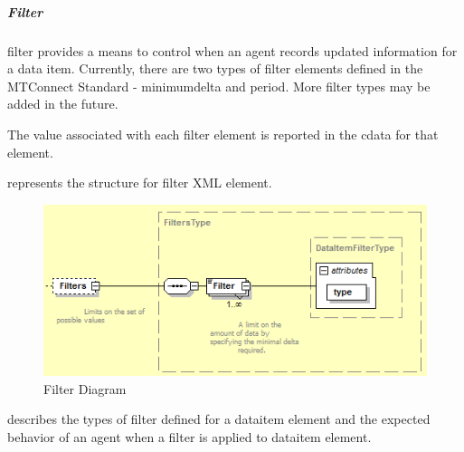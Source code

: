 \documentclass{mtconnect}	%
\begin{document}
\subparagraph{Filter} \mbox{}

\gls{filter} provides a means to control when an \gls{agent} records updated information for a data item.  Currently, there are two types of \gls{filter} elements defined in the MTConnect Standard - \gls{minimumdelta} and \gls{period}.   More \gls{filter} types may be added in the future.

The value associated with each \gls{filter} element is reported in the \gls{cdata} for that element.

 represents the structure for \gls{filter} XML element.

\begin{figure}[ht]
  \centering
  \includegraphics[width=.75\textwidth]{figures/filter-schema-diagram.png}
  \caption{Filter Diagram}
  \label{fig:filter-schema-diagram}
\end{figure}
\FloatBarrier

 describes the types of \gls{filter} defined for a \gls{dataitem} element and the expected behavior of an \gls{agent} when a \gls{filter} is applied to \gls{dataitem} element.
\end{document}
